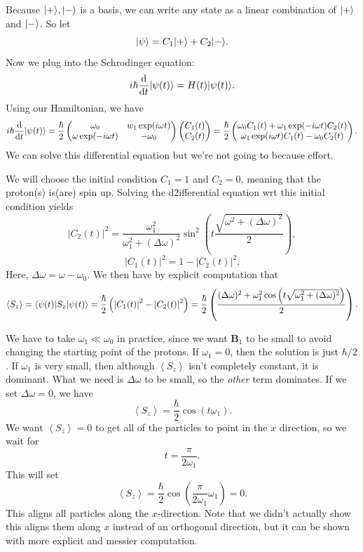 Because $\lvert+\rangle ,\lvert-\rangle $ is a basis, we can write any state as a linear combination of $\lvert+\rangle $ and $\lvert-\rangle $. So let
\[
	\lvert\psi \rangle =C_1\lvert+\rangle +C_2\lvert-\rangle 
.\]
Now we plug into the Schrodinger equation:
\[
	i\hbar \frac{\mathrm{d}}{\mathrm{d}t} \lvert\psi (t)\rangle =H(t)\lvert\psi (t)\rangle 
.\]
Using our Hamiltonian, we have
\[
	i\hbar \frac{\mathrm{d}}{\mathrm{d}t} \lvert\psi (t)\rangle =\frac{\hbar }{2} \begin{pmatrix}
	\omega _0 & w_1 \exp (i\omega t) \\
	\omega \exp (-i\omega t) & -\omega_0
	\end{pmatrix}\begin{pmatrix}
	C_1(t) \\
	C_2(t)
	\end{pmatrix}=\frac{\hbar }{2} \begin{pmatrix}
	\omega _0 C_1(t)+\omega _1 \exp (-i\omega t)C_2(t) \\
	\omega _1 \exp (i\omega t)C_1(t)-\omega _0C_2(t)
	\end{pmatrix}
.\]
We can solve this differential equation but we're not going to because effort.

We will choose the initial condition $C_1=1$ and $C_2=0$, meaning that the proton(s) is(are) spin up. Solving the d2ifferential equation wrt this initial condition yields
\[
	\left| C_2(t) \right|^2=\frac{\omega_1^2}{\omega_1^2+(\Delta \omega )^2} \sin ^2\left( t\frac{\sqrt{\omega ^2+(\Delta \omega )^2} }{2}  \right) 
,\]
\[
	\left| C_1(t) \right| ^2=1-\left| C_2(t) \right| ^2
.\]
Here, $\Delta \omega =\omega -\omega _0$. We then have by explicit computation that
\[
	\left\langle S_z \right\rangle =\langle\psi (t)\rvert S_z\lvert\psi (t)\rangle =\frac{\hbar }{2}\left( \left| C_1(t) \right| ^2-\left| C_2(t) \right| ^2\right)=\frac{\hbar }{2}\left(\frac{  (\Delta \omega )^2+\omega _1^2 \cos \left( t \sqrt{\omega _1^2+(\Delta \omega )^2}  \right)}{2}   \right) 
.\]

We have to take $\omega _1 \ll \omega _0$ in practice, since we want $\mathbf{B}_1$ to be small to avoid changing the starting point of the protons. If $\omega _1=0$, then the solution is just $\hbar /2$. If $\omega _1$ is very small, then although $\left\langle S_z \right\rangle $ isn't completely constant, it is dominant. What we need is $\Delta \omega $ to be small, so the \emph{other} term dominates. If we set $\Delta \omega =0$, we have
\[
	\left\langle S_z \right\rangle =\frac{\hbar }{2} \cos (t\omega _1)
.\]
We want $\left\langle S_z \right\rangle=0$ to get all of the particles to point in the $x$ direction, so we wait for
\[
	t=\frac{\pi }{2\omega _1} 
.\]
This will set
\[
	\left\langle S_z \right\rangle =\frac{\hbar }{2} \cos \left( \frac{\pi }{2\omega _1} \omega _1 \right) =0
.\]
This aligns all particles along the $x$-direction. Note that we didn't actually show this aligns them along $x$ instead of an orthogonal direction, but it can be shown with more explicit and messier computation.

